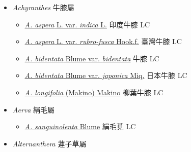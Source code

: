 
  \begin{itemize}
 \item[] \textit{Achyranthes} 牛膝屬
                    
  \begin{itemize}
        \item[] \href{http://www.theplantlist.org/tpl1.1/search?q=Achyranthes+aspera+var.+indica}{\textit{A. aspera} L. var. \textit{indica} L.}   印度牛膝 LC
        \item[] \href{http://www.theplantlist.org/tpl1.1/search?q=Achyranthes+aspera+var.+rubro-fusca}{\textit{A. aspera} L. var. \textit{rubro-fusca} Hook.f.}   臺灣牛膝 LC
        \item[] \href{http://www.theplantlist.org/tpl1.1/search?q=Achyranthes+bidentata+var.+bidentata}{\textit{A. bidentata} Blume var. \textit{bidentata}}   牛膝 LC
        \item[] \href{http://www.theplantlist.org/tpl1.1/search?q=Achyranthes+bidentata+var.+japonica}{\textit{A. bidentata} Blume var. \textit{japonica} Miq.}   日本牛膝 LC
        \item[] \href{http://www.theplantlist.org/tpl1.1/search?q=Achyranthes+longifolia}{\textit{A. longifolia} (Makino) Makino}   柳葉牛膝 LC
  \end{itemize}
 \item[] \textit{Aerva} 絹毛屬
                    
  \begin{itemize}
        \item[] \href{http://www.theplantlist.org/tpl1.1/search?q=Aerva+sanguinolenta}{\textit{A. sanguinolenta} Blume}   絹毛莧 LC
  \end{itemize}
 \item[] \textit{Alternanthera} 蓮子草屬
                    

\end{itemize}
